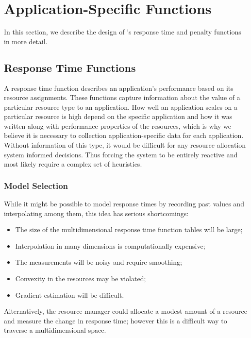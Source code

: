 \section{Application-Specific Functions}\label{app_func}


In this section, we describe the design of \pacora's response time and penalty functions in more detail.

\subsection*{Response Time Functions}


A response time function describes an application's performance based on its resource assignments.  These functions capture information about the value of a particular resource type to an application.  How well an application scales on a particular resource is high depend on the specific application and how it was written along with performance properties of the resources, which is why we believe it is necessary to collection application-specific data for each application. Without information of this type, it would be difficult for any resource allocation system informed decisions.  Thus forcing the system to be entirely reactive and most likely require a complex set of heuristics.


\subsubsection*{Model Selection} While it might be possible to model response times by recording past values and interpolating among them, this idea has serious shortcomings:
\begin{itemize}
\item The size of the multidimensional response time function tables will be large;
\item Interpolation in many dimensions is computationally expensive;
\item The measurements will be noisy and require smoothing;
\item Convexity in the resources may be violated;
\item Gradient estimation will be difficult.
\end{itemize}
Alternatively, the resource manager could allocate a modest amount of a resource and measure the change in response time; however this is a difficult way to traverse a multidimensional space.

